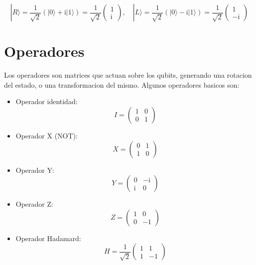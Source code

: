 \documentclass[11pt]{article}
\newcommand{\ii}{\mathrm{i}}
\begin{document}
\begin{equation}
    |R\rangle = \frac{1}{\sqrt{2}} (|0\rangle + \ii |1\rangle) = \frac{1}{\sqrt{2}} \begin{pmatrix} 1 \\ \ii \end{pmatrix}, \quad |L\rangle = \frac{1}{\sqrt{2}} (|0\rangle - \ii |1\rangle) = \frac{1}{\sqrt{2}} \begin{pmatrix} 1 \\ -\ii \end{pmatrix}
\end{equation}



\section{Operadores}

Los operadores son matrices que actuan sobre los qubits, generando una rotacion del estado, o una transformacion del mismo. Algunos operadores basicos son:

\begin{itemize}
    \item Operador identidad:
    \begin{equation}
        I = \begin{pmatrix} 1 & 0 \\ 0 & 1 \end{pmatrix}
    \end{equation}
    
    \item Operador X (NOT):
    \begin{equation}
        X = \begin{pmatrix} 0 & 1 \\ 1 & 0 \end{pmatrix}
    \end{equation}
    
    \item Operador Y:
    \begin{equation}
        Y = \begin{pmatrix} 0 & -\ii \\ \ii & 0 \end{pmatrix}
    \end{equation}
    
    \item Operador Z:
    \begin{equation}
        Z = \begin{pmatrix} 1 & 0 \\ 0 & -1 \end{pmatrix}
    \end{equation}
    
    \item Operador Hadamard:
    \begin{equation}
        H = \frac{1}{\sqrt{2}} \begin{pmatrix} 1 & 1 \\ 1 & -1 \end{pmatrix}
    \end{equation}
\end{itemize}
\end{document}
